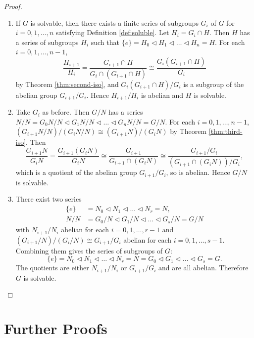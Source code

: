 \begin{proof}
	\begin{enumerate}[label=(\roman*)]
		\item If $G$ is solvable, then there exists a finite series of subgroups $G_i$ of $G$ for $i = 0, 1, \dots, n$ satisfying Definition \ref{def:soluble}. Let $H_i = G_i \cap H$. Then $H$ has a series of subgroups $H_i$ such that $\{ e \} = H_0 \triangleleft H_1 \triangleleft \dots \triangleleft H_n = H.$
		For each $i = 0, 1, \dots, n - 1$, 
		$$
		\frac{H_{i+1}}{H_i} 
		= \frac{G_{i+1} \cap H}{G_i \cap (G_{i+1} \cap H)}
		\cong \frac{G_i(G_{i+1} \cap H)} {G_i}
		$$
		by Theorem \ref{thm:second-iso}, and ${G_i(G_{i+1} \cap H)}/{G_i}$ is a subgroup of the abelian group $G_{i+1} / G_{i}$. Hence $H_{i+1} / H_{i}$ is abelian and $H$ is solvable.
		\item Take $G_i$ as before. Then $G / N$ has a series
		$N/N = G_0 N / N \triangleleft G_1 N / N \triangleleft \dots \triangleleft G_n N / N  =  G / N. $
		For each $i = 0, 1, \dots, n - 1$, 
		$(G_{i+1} N / N) / (G_{i} N / N) \cong (G_{i+1} N) / (G_i N)$
		by Theorem \ref{thm:third-iso}. Then 
		$$
		\frac{G_{i+1} N}{G_i N} =\frac{G_{i+1}\left(G_i N\right)}{G_i N} \cong \frac{G_{i+1}}{G_{i+1} \cap\left(G_i N\right)} \cong \frac{G_{i+1} / G_i}{\left(G_{i+1} \cap\left(G_i N\right)\right) / G_i},
		$$
		which is a quotient of the abelian group $G_{i+1} / G_i$, so is abelian. Hence $G / N$ is solvable.
		\item There exist two series
		$$
		\begin{aligned}
			\{ e \} & =N_0 \triangleleft N_1 \triangleleft \ldots \triangleleft N_r=N, \\
			N / N & =G_0 / N \triangleleft G_1 / N \triangleleft \ldots \triangleleft G_s / N=G / N
		\end{aligned}
		$$
		with $N_{i+1} / N_{i}$ abelian for each $i = 0, 1, \dots, r-1$ and $(G_{i+1} / N)  / (G_{i} / N) \cong G_{i+1} / G_i $ abelian for each $i = 0,1, \dots, s-1$. Combining them gives the series of subgroups of $G$:
		$$
		\{ e \}=N_0 \triangleleft N_1 \triangleleft \ldots \triangleleft N_r=N=G_0 \triangleleft G_1 \triangleleft \ldots \triangleleft G_s=G .
		$$
		The quotients are either $N_{i+1} / N_i$  or $G_{i+1} / G_i$ and are all abelian. Therefore $G$ is solvable.
	\end{enumerate}
\end{proof}


\section{Further Proofs} 
